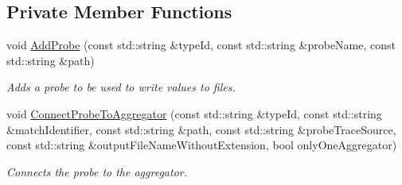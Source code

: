 \subsection*{Private Member Functions}
\begin{DoxyCompactItemize}
\item 
void \hyperlink{classns3_1_1FileHelper_a9783aea2aed4b310288ed1b79af1f66e}{Add\+Probe} (const std\+::string \&type\+Id, const std\+::string \&probe\+Name, const std\+::string \&path)
\begin{DoxyCompactList}\small\item\em Adds a probe to be used to write values to files. \end{DoxyCompactList}\item 
void \hyperlink{classns3_1_1FileHelper_af67443ae87a58eeaa0536b38e9349a07}{Connect\+Probe\+To\+Aggregator} (const std\+::string \&type\+Id, const std\+::string \&match\+Identifier, const std\+::string \&path, const std\+::string \&probe\+Trace\+Source, const std\+::string \&output\+File\+Name\+Without\+Extension, bool only\+One\+Aggregator)
\begin{DoxyCompactList}\small\item\em Connects the probe to the aggregator. \end{DoxyCompactList}\end{DoxyCompactItemize}
